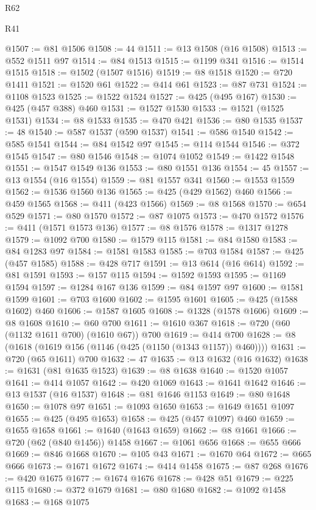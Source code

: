 \begin{lexlean}{R62}
\begin{lexlean}{R41}
\begin{coremodule}
{{{{{{{{{{{{{{{{{{{{{{{{{{{{{{{{{{{{{{{{{{{{{{{{{{{{{{{{{{{{{{{{{{{{{{{{{{{{{{{{{{{{{{{@1507 := @81 @1506
@1508 := 44
@1511 := @13 @1508 (@16 @1508)
@1513 := @552 @1511 @97
@1514 := @84 @1513
@1515 := @1199 @341
@1516 := @1514 @1515
@1518 := @1502 (@1507 @1516)
@1519 := @8 @1518
@1520 := @720 @1411
@1521 := @1520 @61
@1522 := @414 @61
@1523 := @87 @731
@1524 := @1108 @1523
@1525 := @1522 @1524
@1527 := @425 (@495 @167)
@1530 := @425 (@457 @388) @460
@1531 := @1527 @1530
@1533 := @1521 (@1525 @1531)
@1534 := @8 @1533
@1535 := @470 @421
@1536 := @80 @1535
@1537 := 48
@1540 := @587 @1537 (@590 @1537)
@1541 := @586 @1540
@1542 := @585 @1541
@1544 := @84 @1542 @97
@1545 := @114 @1544
@1546 := @372 @1545
@1547 := @80 @1546
@1548 := @1074 @1052
@1549 := @1422 @1548
@1551 := @1547 @1549 @136
@1553 := @80 @1551 @136
@1554 := 45
@1557 := @13 @1554 (@16 @1554)
@1559 := @81 @1557 @341
@1560 := @1553 @1559
@1562 := @1536 @1560 @136
@1565 := @425 (@429 @1562) @460
@1566 := @459 @1565
@1568 := @411 (@423 @1566)
@1569 := @8 @1568
@1570 := @654 @529
@1571 := @80 @1570
@1572 := @87 @1075
@1573 := @470 @1572
@1576 := @411 (@1571 @1573 @136)
@1577 := @8 @1576
@1578 := @1317 @1278
@1579 := @1092 @700
@1580 := @1579 @115
@1581 := @84 @1580
@1583 := @84 @1283 @97
@1584 := @1581 @1583
@1585 := @703 @1584
@1587 := @425 (@457 @1585)
@1588 := @428 @717
@1591 := @13 @614 (@16 @614)
@1592 := @81 @1591
@1593 := @157 @115
@1594 := @1592 @1593
@1595 := @1169 @1594
@1597 := @1284 @167 @136
@1599 := @84 @1597 @97
@1600 := @1581 @1599
@1601 := @703 @1600
@1602 := @1595 @1601
@1605 := @425 (@1588 @1602) @460
@1606 := @1587 @1605
@1608 := @1328 (@1578 @1606)
@1609 := @8 @1608
@1610 := @60 @700
@1611 := @1610 @367
@1618 := @720 (@60 (@1132 @1611 @700) (@1610 @67)) @700
@1619 := @414 @700
@1628 := @8 (@1618 (@1619 @156 (@1146 (@425 (@1150 (@1343 @1157)) @460))))
@1631 := @720 (@65 @1611) @700
@1632 := 47
@1635 := @13 @1632 (@16 @1632)
@1638 := @1631 (@81 @1635 @1523)
@1639 := @8 @1638
@1640 := @1520 @1057
@1641 := @414 @1057
@1642 := @420 @1069
@1643 := @1641 @1642
@1646 := @13 @1537 (@16 @1537)
@1648 := @81 @1646 @1153
@1649 := @80 @1648
@1650 := @1078 @97
@1651 := @1093 @1650
@1653 := @1649 @1651 @1097
@1655 := @425 (@495 @1653)
@1658 := @425 (@457 @1097) @460
@1659 := @1655 @1658
@1661 := @1640 (@1643 @1659)
@1662 := @8 @1661
@1666 := @720 (@62 (@840 @1456)) @1458
@1667 := @1061 @656
@1668 := @655 @666
@1669 := @846 @1668
@1670 := @105 @43
@1671 := @1670 @64
@1672 := @665 @666
@1673 := @1671 @1672
@1674 := @414 @1458
@1675 := @87 @268
@1676 := @420 @1675
@1677 := @1674 @1676
@1678 := @428 @51
@1679 := @225 @115
@1680 := @372 @1679
@1681 := @80 @1680
@1682 := @1092 @1458
@1683 := @168 @1075
}}}}}}}}}}}}}}}}}}}}}}}}}}}}}}}}}}}}}}}}}}}}}}}}}}}}}}}}}}}}}}}}}}}}}}}}}}}}}}}}}}}}}}}
\end{coremodule}
\end{lexlean}
\end{lexlean}
